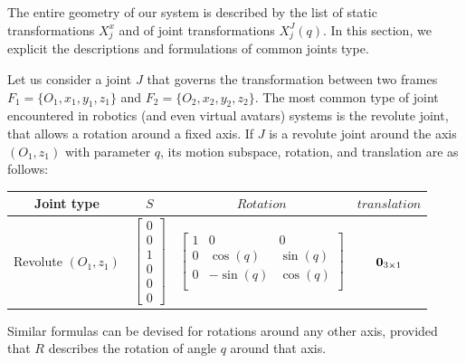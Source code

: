 
The entire geometry of our system is described by the list of static transformations $X^x_j$ and of joint transformations $X^J_j (q)$.
In this section, we explicit the descriptions and formulations of common joints type.

Let us consider a joint $J$ that governs the transformation between two frames $F_1=\{O_1, x_1, y_1, z_1\}$ and $F_2=\{O_2, x_2, y_2, z_2\}$.
The most common type of joint encountered in robotics (and even virtual avatars) systems is the revolute joint, that allows a rotation around a fixed axis.
If $J$ is a revolute joint around the axis $(O_1,z_1)$ with parameter $q$, its motion subspace, rotation, and translation are as follows:
\begin{table} [H]
\centering
\begin{tabular}{cccc}
  \toprule
  Joint type & $S$ & $Rotation$ & $translation$ \\
  \midrule
  Revolute $(O_1,z_1)$
  &
  $\begin{bmatrix}
    0 \\ 0 \\ 1 \\ 0 \\ 0 \\ 0
  \end{bmatrix}$
  &
  $\begin{bmatrix}
    1 & 0 & 0 \\
    0 & \cos (q) & \sin (q) \\
    0 & -\sin (q) & \cos (q) \\
  \end{bmatrix}$
  &
  ${\bf 0}_{3\times1}$
  \\
  \bottomrule
\end{tabular}
\end{table}

Similar formulas can be devised for rotations around any other axis, provided that $R$ describes the rotation of angle $q$ around that axis.

